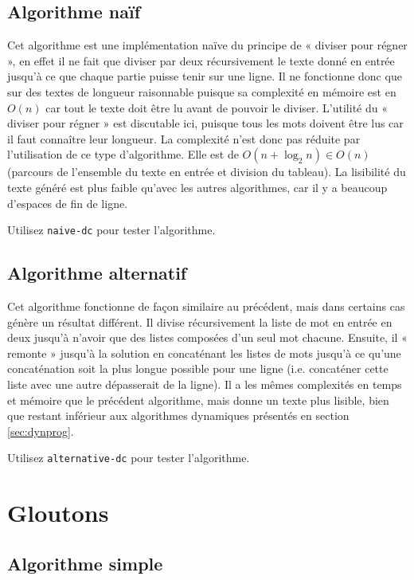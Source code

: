 \documentclass[a4paper, 11pt]{article}
\begin{document}
\subsection{Algorithme naïf}

Cet algorithme est une implémentation naïve du principe de « diviser pour régner
», en effet il ne fait que diviser par deux récursivement le texte donné en
entrée jusqu'à ce que chaque partie puisse tenir sur une ligne. Il ne fonctionne
donc que sur des textes de longueur raisonnable puisque sa complexité en mémoire
est en $O(n)$ car tout le texte doit être lu avant de pouvoir le diviser.
L'utilité du « diviser pour régner » est discutable ici, puisque tous les mots
doivent être lus car il faut connaître leur longueur. La complexité n'est donc
pas réduite par l'utilisation de ce type d'algorithme. Elle est de
$O(n+\log_2 n) \in O(n)$ (parcours de l'ensemble du texte en entrée et division
du tableau). La lisibilité du texte généré est plus faible qu'avec les autres
algorithmes, car il y a beaucoup d'espaces de fin de ligne.

Utilisez \verb|naive-dc| pour tester l'algorithme.

\subsection{Algorithme alternatif}

Cet algorithme fonctionne de façon similaire au précédent, mais dans certains
cas génère un résultat différent. Il divise récursivement la liste de mot en
entrée en deux jusqu'à n'avoir que des listes composées d'un seul mot chacune.
Ensuite, il « remonte » jusqu'à la solution en concaténant les listes de mots
jusqu'à ce qu'une concaténation soit la plus longue possible pour une ligne
(i.e. concaténer cette liste avec une autre dépasserait de la ligne). Il a les
mêmes complexités en temps et mémoire que le précédent algorithme, mais donne un
texte plus lisible, bien que restant inférieur aux algorithmes dynamiques
présentés en section \ref{sec:dynprog}.

Utilisez \verb|alternative-dc| pour tester l'algorithme.

\section{Gloutons}

\subsection{Algorithme simple}
\label{sec:simple-greedy}
\end{document}
